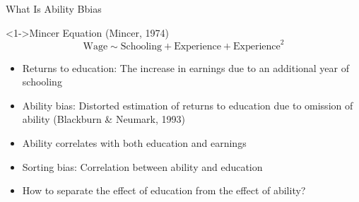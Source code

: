 \documentclass{beamer} %
\begin{document}
\begin{frame}{What Is Ability Bbias}

    \begin{block}<1->{Mincer Equation (Mincer, 1974)}
        \large
        \begin{equation*}
            \text{Wage} \sim \text{Schooling} + \text{Experience} + \text{Experience}^2
        \end{equation*}
    \end{block}

    \begin{itemize}
        \item<1-> Returns to education: The increase in earnings due to an additional year of schooling
        \item<2-> Ability bias: Distorted estimation of returns to education due to omission of ability (Blackburn \& Neumark, 1993)
        \item<3-> Ability correlates with both education and earnings
        \item<4-> Sorting bias: Correlation between ability and education
        \item<5-> How to separate the effect of education from the effect of ability?
    \end{itemize}

\end{frame}
\end{document}
